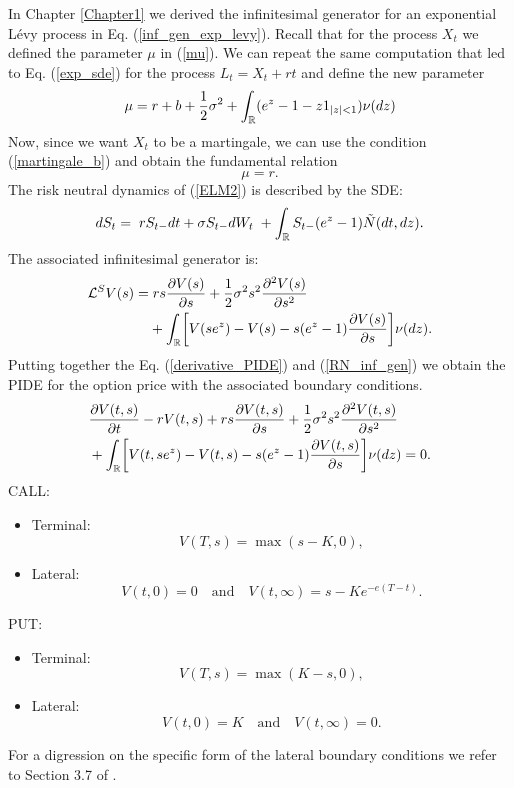 In Chapter \ref{Chapter1} we derived the infinitesimal generator for an exponential Lévy process in Eq. (\ref{inf_gen_exp_levy}). Recall that for the process $X_t$ we defined the 
parameter $\mu$ in (\ref{mu}).
We can repeat the same computation that led to Eq. (\ref{exp_sde}) for the process $L_t = X_t + rt$ and define the new parameter
\begin{equation}\label{mu2}
 \mu = r + b + \frac{1}{2}\sigma^2 + \int_{\mathbb{R}} ( e^{z} - 1 -z1_{|z|<1}) \nu(dz)
\end{equation}
Now, since we want $X_t$ to be a martingale, we can use the condition (\ref{martingale_b}) and obtain the fundamental relation
\begin{equation}\label{mu=r}
 \mu = r.
\end{equation}
The risk neutral dynamics of (\ref{ELM2}) is described by the SDE:
\begin{equation}\label{RN_sde}
 d S_t = \; r S_{t-} dt +  \sigma S_{t-} dW_t \; + \int_{\mathbb{R}} S_{t-} (e^{z} - 1) \tilde N(dt,dz). 
\end{equation}
The associated infinitesimal generator is:
\begin{align}\label{RN_inf_gen}
 \mathcal{L}^S V(s) =& \; r s \frac{\partial V(s)}{\partial s}
+ \frac{1}{2} \sigma^2 s^2 \frac{\partial^2  V(s)}{\partial s^2}  \\ \nonumber
&+ \int_{\mathbb{R}} \biggl[ V(se^z) - V(s) - s(e^z-1)\frac{\partial V(s)}{\partial s} \biggr] \nu(dz).
\end{align}
Putting together the Eq. (\ref{derivative_PIDE}) and (\ref{RN_inf_gen}) we obtain the PIDE for the option price with the associated boundary conditions.
\begin{align}\label{PIDE_option}
&  \frac{\partial V(t,s)}{\partial t} - r V(t,s) + r s \frac{\partial V(t,s)}{\partial s}
+ \frac{1}{2} \sigma^2 s^2 \frac{\partial^2  V(t,s)}{\partial s^2}  \\ \nonumber
&+ \int_{\mathbb{R}} \biggl[ V(t,se^z) - V(t,s) - s(e^z-1)\frac{\partial V(t,s)}{\partial s} \biggr] \nu(dz) = 0.
\end{align}
CALL:
\begin{itemize}
 \item Terminal:
 $$ V(T,s) = \max(s-K,0), $$
 \item Lateral:
 $$ V(t,0) = 0 \quad \mbox{and} \quad V(t, \infty) = s - Ke^{-e(T-t)}. $$
\end{itemize}
PUT:
\begin{itemize}
 \item Terminal:
 $$ V(T,s) = \max(K-s,0), $$
 \item Lateral:
 $$ V(t,0) = K \quad \mbox{and} \quad V(t, \infty) = 0. $$
\end{itemize}
For a digression on the specific form of the lateral boundary conditions we refer to Section 3.7 of \cite{Wilmott}. 

